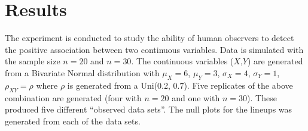 \documentclass[12]{report}
\begin{document}


\section{Results}\label{results}
The experiment is conducted to study the ability of human observers to detect the positive association between two continuous variables. Data is simulated with the sample size $n = 20$ and $n=30$. The continuous variables ($X$,$Y$) are generated from a Bivariate Normal distribution with $\mu_X = 6$, $\mu_Y = 3$, $\sigma_X = 4$, $\sigma_Y = 1$, $\rho_{XY} = \rho$ where $\rho$ is generated from a Uni(0.2, 0.7). Five replicates of the above combination are generated (four with $n =20$ and one with $n=30$). These produced five different ``observed data sets''. The null plots for the lineups was generated from each of the data sets. \\
\end{document}
